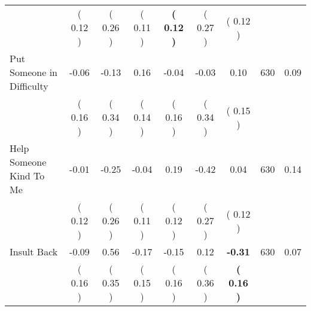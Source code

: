 \begin{tabular}{lcccccccc}
 & (     0.12 ) & (     0.26 ) & (     0.11 ) & \textbf{(     0.12 )} & (     0.27 ) & (     0.12 ) & \\
Put Someone in Difficulty &     -0.06 &     -0.13 &      0.16 &     -0.04 &     -0.03 &      0.10 & 630 &       0.09 \\ 
 & (     0.16 ) & (     0.34 ) & (     0.14 ) & (     0.16 ) & (     0.34 ) & (     0.15 ) & \\
Help Someone Kind To Me &     -0.01 &     -0.25 &     -0.04 &      0.19 &     -0.42 &      0.04 & 630 &       0.14 \\ 
 & (     0.12 ) & (     0.26 ) & (     0.11 ) & (     0.12 ) & (     0.27 ) & (     0.12 ) & \\
Insult Back &     -0.09 &      0.56 &     -0.17 &     -0.15 &      0.12 & \textbf{    -0.31} & 630 &       0.07 \\ 
 & (     0.16 ) & (     0.35 ) & (     0.15 ) & (     0.16 ) & (     0.36 ) & \textbf{(     0.16 )} & \\
\bottomrule
\end{tabular}
